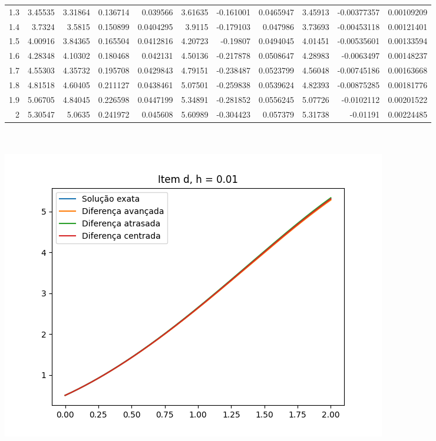 {\begin{tabular}{rrrrrrrrrrr}
 1.3 & 3.45535  & 3.31864 &    0.136714   &     0.039566  & 3.61635  &   -0.161001   &     0.0465947 & 3.45913  &  -0.00377357  &   0.00109209  \\
 1.4 & 3.7324   & 3.5815  &    0.150899   &     0.0404295 & 3.9115   &   -0.179103   &     0.047986  & 3.73693  &  -0.00453118  &   0.00121401  \\
 1.5 & 4.00916  & 3.84365 &    0.165504   &     0.0412816 & 4.20723  &   -0.19807    &     0.0494045 & 4.01451  &  -0.00535601  &   0.00133594  \\
 1.6 & 4.28348  & 4.10302 &    0.180468   &     0.042131  & 4.50136  &   -0.217878   &     0.0508647 & 4.28983  &  -0.0063497   &   0.00148237  \\
 1.7 & 4.55303  & 4.35732 &    0.195708   &     0.0429843 & 4.79151  &   -0.238487   &     0.0523799 & 4.56048  &  -0.00745186  &   0.00163668  \\
 1.8 & 4.81518  & 4.60405 &    0.211127   &     0.0438461 & 5.07501  &   -0.259838   &     0.0539624 & 4.82393  &  -0.00875285  &   0.00181776  \\
 1.9 & 5.06705  & 4.84045 &    0.226598   &     0.0447199 & 5.34891  &   -0.281852   &     0.0556245 & 5.07726  &  -0.0102112   &   0.00201522  \\
 2   & 5.30547  & 5.0635  &    0.241972   &     0.045608  & 5.60989  &   -0.304423   &     0.057379  & 5.31738  &  -0.01191     &   0.00224485  \\
\hline
\end{tabular}
}
        \\
        \\
        \includegraphics{d_h_0.01.png}
